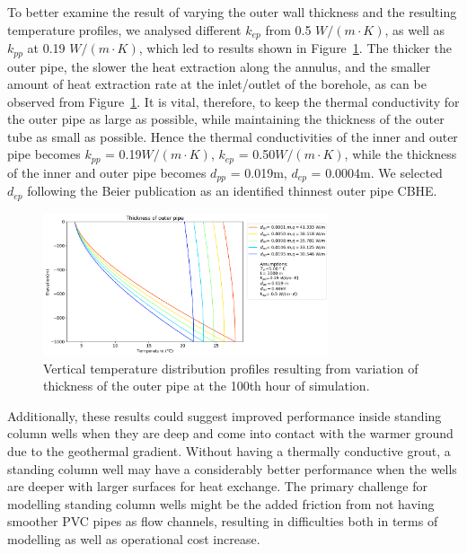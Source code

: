 		To better examine the result of varying the outer wall thickness and the resulting temperature profiles, we analysed different $k_{ep}$ from 0.5 $W/(m \cdot K)$, as well as $k_{pp}$ at 0.19 $W/(m \cdot K)$, which led to results shown in Figure~\ref{fig:thickkep}. The thicker the outer pipe, the slower the heat extraction along the annulus, and the smaller amount of heat extraction rate at the inlet/outlet of the borehole, as can be observed from Figure~\ref{fig:thickkep}. It is vital, therefore, to keep the thermal conductivity for the outer pipe as large as possible, while maintaining the thickness of the outer tube as small as possible. Hence the thermal conductivities of the inner and outer pipe becomes $k_{pp}$ = 0.19$W/(m \cdot K)$, $k_{ep}$ = 0.50$W/(m \cdot K)$, while the thickness of the inner and outer pipe becomes $d_{pp}$ = 0.019m, $d_{ep}$ = 0.0004m. We selected $d_{ep}$ following the Beier publication as an identified thinnest outer pipe CBHE.
        \begin{figure}[h!]
            \centering
            \includegraphics[width=0.75\textwidth]{dep_1000_MIN.png}
            \caption{Vertical temperature distribution profiles resulting from variation of thickness of the outer pipe at the 100th hour of simulation.}
            \label{fig:thickkep}
        \end{figure}
		
		Additionally, these results could suggest improved performance inside standing column wells when they are deep and come into contact with the warmer ground due to the geothermal gradient. Without having a thermally conductive grout, a standing column well may have a considerably better performance when the wells are deeper with larger surfaces for heat exchange. The primary challenge for modelling standing column wells might be the added friction from not having smoother PVC pipes as flow channels, resulting in difficulties both in terms of modelling as well as operational cost increase.
